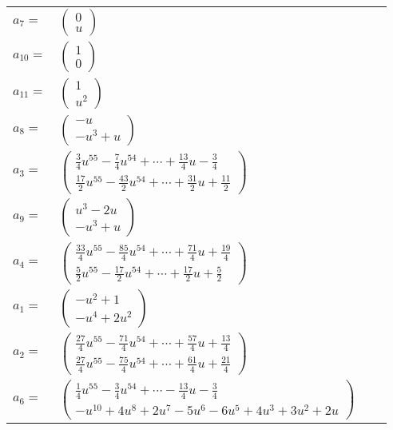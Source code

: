 \documentclass[1p]{elsarticle_modified}
\theoremstyle{definition}
\begin{document}
\begin{tabular}{m{7pt} m{180pt} m{7pt} m{180pt} }
\flushright $a_{7}=$&$\begin{pmatrix}0\\u\end{pmatrix}$ \\
\flushright $a_{10}=$&$\begin{pmatrix}1\\0\end{pmatrix}$ \\
\flushright $a_{11}=$&$\begin{pmatrix}1\\u^2\end{pmatrix}$ \\
\flushright $a_{8}=$&$\begin{pmatrix}- u\\- u^3+u\end{pmatrix}$ \\
\flushright $a_{3}=$&$\begin{pmatrix}\frac{3}{4} u^{55}-\frac{7}{4} u^{54}+\cdots+\frac{13}{4} u-\frac{3}{4}\\\frac{17}{2} u^{55}-\frac{43}{2} u^{54}+\cdots+\frac{31}{2} u+\frac{11}{2}\end{pmatrix}$ \\
\flushright $a_{9}=$&$\begin{pmatrix}u^3-2 u\\- u^3+u\end{pmatrix}$ \\
\flushright $a_{4}=$&$\begin{pmatrix}\frac{33}{4} u^{55}-\frac{85}{4} u^{54}+\cdots+\frac{71}{4} u+\frac{19}{4}\\\frac{5}{2} u^{55}-\frac{17}{2} u^{54}+\cdots+\frac{17}{2} u+\frac{5}{2}\end{pmatrix}$ \\
\flushright $a_{1}=$&$\begin{pmatrix}- u^2+1\\- u^4+2 u^2\end{pmatrix}$ \\
\flushright $a_{2}=$&$\begin{pmatrix}\frac{27}{4} u^{55}-\frac{71}{4} u^{54}+\cdots+\frac{57}{4} u+\frac{13}{4}\\\frac{27}{4} u^{55}-\frac{75}{4} u^{54}+\cdots+\frac{61}{4} u+\frac{21}{4}\end{pmatrix}$ \\
\flushright $a_{6}=$&$\begin{pmatrix}\frac{1}{4} u^{55}-\frac{3}{4} u^{54}+\cdots-\frac{13}{4} u-\frac{3}{4}\\- u^{10}+4 u^8+2 u^7-5 u^6-6 u^5+4 u^3+3 u^2+2 u\end{pmatrix}$ \\

\end{tabular}
\end{document}
